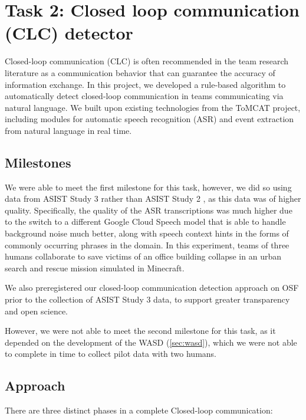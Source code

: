\section{Task 2: Closed loop communication (CLC) detector}
\label{sec:clc}

Closed-loop communication (CLC) is often recommended in the team research
literature as a communication behavior that can guarantee the accuracy of
information exchange. In this project, we developed a rule-based algorithm to
automatically detect closed-loop communication in teams communicating via
natural language.
We built upon existing technologies from the ToMCAT project, including modules
for automatic speech recognition (ASR) and event extraction from natural language in real
time.

\subsection{Milestones}

We were able to meet the first milestone for this task, however, we did so
using data from ASIST Study 3
\cite{huang_freeman_cooke_colonna-romano_wood_buchanan_caufman_2022} rather
than ASIST Study 2
\cite{huang_freeman_cooke_dubrow_colonna-romano_wood_buchanan_caufman_2021}, as
this data was of higher quality. Specifically, the quality of the ASR
transcriptions was much higher due to the switch to a different Google Cloud
Speech model that is able to handle background noise much better, along with
speech context hints in the forms of commonly occurring phrases in the domain.
In this experiment, teams of three humans collaborate to save victims of an
office building collapse in an urban search and rescue mission simulated in
Minecraft.

We also preregistered our closed-loop communication detection approach on OSF
\cite{pyarelal_2022} prior to the collection of ASIST Study 3 data, to support
greater transparency and open science.

However, we were not able to meet the second milestone for this task, as it
depended on the development of the WASD (\autoref{sec:wasd}), which we were not able
to complete in time to collect pilot data with two humans.

\subsection{Approach}

There are three distinct phases in a complete Closed-loop communication:

